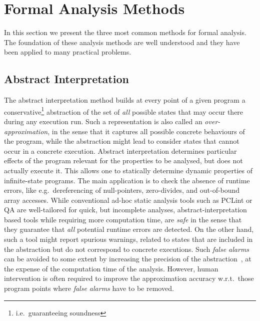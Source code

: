 \chapter{Formal Analysis Methods}
\label{sec:formal-analysis}

In this section we present
the three most common methods for formal analysis.
The foundation of these analysis
methods are well understood and they have been
applied to many practical problems.


\section{Abstract Interpretation}
\label{sec:Abstract Interpretation}

The abstract interpretation method
\cite{Cousot.Cousot.1976}
builds at every point of a given program a conservative\footnote{
        i.e.\ guaranteeing soundness
}
abstraction
of the set of \emph{all} possible states that may occur there
during any execution run. Such a representation is also called an 
\emph{over-approximation}, in the sense that it captures all possible
concrete behaviours of the program, while the abstraction might lead to 
consider states that cannot occur in a concrete execution.
%
Abstract interpretation 
determines particular effects of the program relevant for the
properties to be analysed, but does not actually execute it.
%
This allows one to statically determine dynamic properties of
infinite-state programs.
%
The main application is to check the absence of runtime errors, like
e.g.\ dereferencing of null-pointers, zero-divides,
and out-of-bound array accesses.
%
While conventional ad-hoc static analysis tools such as PCLint or \mbox{QA\cxx}
are well-tailored for quick, but incomplete analyses,
abstract-interpretation based tools while requiring more computation time, are
\emph{safe} in the sense that they guarantee that {\em all} potential
runtime errors are detected. On the other hand, such a tool might report 
spurious warnings, related to states that are included in the abstraction but
do not correspond to concrete executions. Such \emph{false alarms} can be
avoided to some extent by increasing the precision of the 
abstraction~\cite{Souyris.Delmas.2007},
at the expense of the computation time of the analysis. However,
%
human intervention is often required to improve the approximation accuracy
w.r.t.\ those program points where {\em false alarms}
have to be removed.


